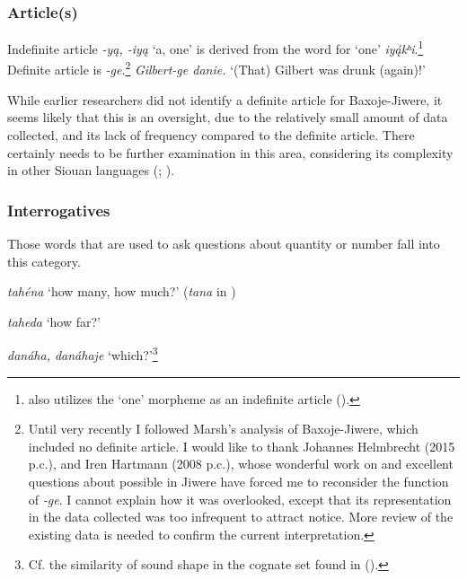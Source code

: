 \documentclass[output=paper]{LSP/langsci}
\begin{document}
\subsubsection{Article(s)}  

Indefinite article \textit{-y\k{a}, -iy\k{a}} `a, one' is derived from the word for `one' \textit{iy\k{á}kʰi}.\footnote{ also utilizes the `one' morpheme as an indefinite article (\citealt[755-756]{Ullrich2008}).} Definite article is \textit{-ge}.\footnote{Until very recently I followed Marsh's \citeyearpar{Marsh1936} analysis of Baxoje-Jiwere, which included no definite article. I would like to thank Johannes Helmbrecht (2015 p.c.), and Iren Hartmann (2008 p.c.), whose wonderful work on  and excellent questions about possible  in Jiwere have forced me to reconsider the function of \textit{-ge}. I cannot explain how it was overlooked, except that its representation in the data collected was too infrequent to attract notice. More review of the existing data is needed to confirm the current interpretation.}   \textit{Gilbert-ge danie.}  `(That) Gilbert was drunk (again)!'

While earlier researchers did not identify a definite article for Baxoje-Jiwere, it seems likely that this is an oversight, due to the relatively small amount of data collected, and its lack of frequency compared to the  definite article. There certainly needs to be further examination in this area, considering its complexity in other Siouan languages (\citealt{Rankin1977,Rankin2005b}; \citealt[455]{RoodTaylor1996}).  

\subsubsection{Interrogatives}

Those words that are used to ask questions about quantity or number fall into this category.  

\hspace{2em} \textit{tahéna} `how many, how much?'       (\textit{tana} in \citealt{HamiltonIrvin1848})

\hspace{2em} \textit{taheda}  `how far?'  

\hspace{2em} \textit{danáha, danáhaje}  `which?'\footnote{Cf. the similarity of sound shape in the cognate set found in  (\citealt[455-457]{RoodTaylor1996}).}
\end{document}
